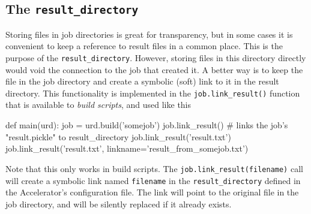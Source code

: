 \subsection{The \texttt{result\_directory}}
\label{sec:RESULT_DIR}
Storing files in job directories is great for transparency, but in
some cases it is convenient to keep a reference to result files in a
common place.  This is the purpose of the \texttt{result\_directory}.
However, storing files in this directory directly would void the
connection to the job that created it.  A better way is to keep the
file in the job directory and create a symbolic (soft) link to it in
the result directory.  This functionality is implemented in the
\texttt{job.link\_result()} function that is available to
\textsl{build scripts}, and used like this
\begin{python}
def main(urd):
    job = urd.build('somejob')
    job.link_result()  # links the job's "result.pickle" to result_directory
    job.link_result('result.txt')
    job.link_result('result.txt', linkname='result_from_somejob.txt')
\end{python}
Note that this only works in build scripts.  The
\texttt{job.link\_result(filename)} call will create a symbolic link
named \texttt{filename} in the \texttt{result\_directory} defined in
the Accelerator's configuration file.  The link will point to the
original file in the job directory, and will be silently replaced if
it already exists.

